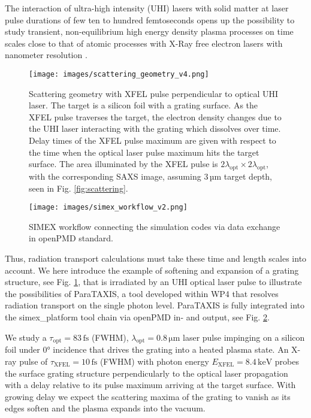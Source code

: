 The interaction of ultra-high intensity (UHI) lasers with solid matter at laser pulse durations of few ten to hundred femtoseconds opens up the possibility to study transient, non-equilibrium high energy density plasma processes on time scales close to that of atomic processes with X-Ray free electron lasers with nanometer resolution \cite{Kluge2016}.

\begin{figure}
\centering
  \texttt{[image: images/scattering\_geometry\_v4.png]}
\caption{
Scattering geometry with XFEL pulse perpendicular to optical UHI laser. The target is a silicon foil with a grating surface. As the XFEL pulse traverses the target, the electron density changes due to the UHI laser interacting with the grating which dissolves over time. Delay times of the XFEL pulse maximum are given with respect to the time when the optical laser pulse maximum hits the target surface.
The area illuminated by the XFEL pulse is $2\lambda_\mathrm{opt} \times 2\lambda_\mathrm{opt}$, with the corresponding SAXS image, assuming $3\,\mathrm{µm}$ target depth, seen in Fig. \ref{fig:scattering}.
}
  \label{fig:density}
\end{figure}

\begin{figure}
\centering
  \texttt{[image: images/simex\_workflow\_v2.png]}
\caption{
SIMEX workflow connecting the simulation codes via data exchange in openPMD standard.
}
  \label{fig:workflows}
\end{figure}

Thus, radiation transport calculations must take these time and length scales into account. We here introduce the example of softening and expansion of a grating structure, see Fig. \ref{fig:density},  that is irradiated by an UHI optical laser pulse to illustrate the possibilities of ParaTAXIS, a tool developed within WP4 that resolves radiation transport on the single photon level. ParaTAXIS is fully integrated into the simex\_platform tool chain via openPMD \cite{Huebl2017} in- and output, see Fig. \ref{fig:workflows}.

We study a $\tau_\mathrm{opt} = 83\,\mathrm{fs}$ (FWHM), $\lambda_\mathrm{opt} = 0.8\,\mathrm{\mu m}$ laser pulse impinging on a silicon foil under 0° incidence that drives the grating into a heated plasma state. An X-ray pulse of $\tau_\mathrm{XFEL} = 10\,\mathrm{fs}$ (FWHM) with photon energy $E_\mathrm{XFEL} =8.4\,\mathrm{keV}$ probes the surface grating structure perpendicularly to the optical laser propagation with a delay relative to its pulse maximum arriving at the target surface. With growing delay we expect the scattering maxima of the grating to vanish as its edges soften and the plasma expands into the vacuum.

